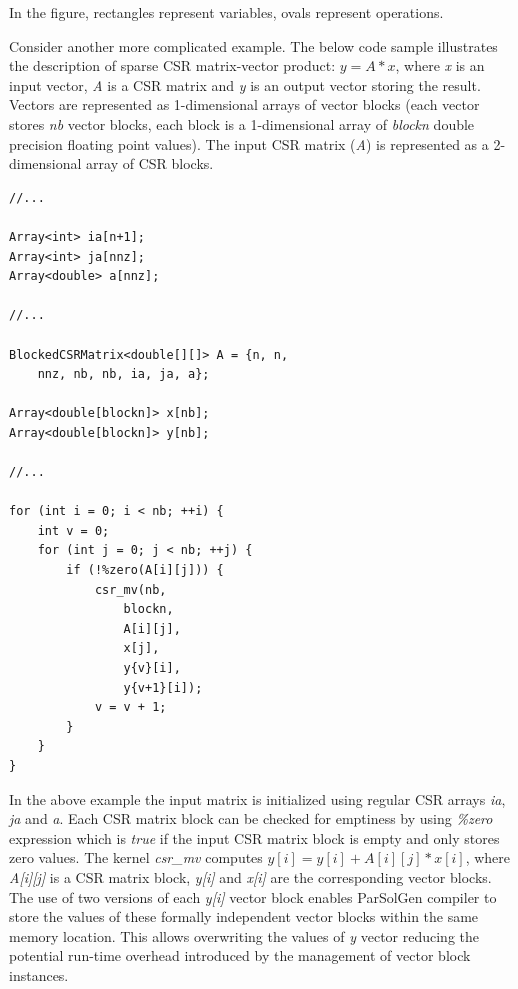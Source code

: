 \documentclass[conference]{IEEEtran}
\begin{document}
In the figure, rectangles represent variables, ovals represent operations.

Consider another more complicated example.
The below code sample illustrates the description of sparse CSR matrix-vector product: \(y = A*x\), where 
\textit{x} is an input vector, \textit{A} is a CSR matrix and \textit{y} is an output vector storing the result. 
Vectors are represented as 1-dimensional arrays of vector blocks (each vector stores \textit{nb} vector blocks, each 
block is a 1-dimensional array of \textit{blockn} double precision floating point values). The input CSR matrix 
(\textit{A}) is represented as a 2-dimensional array of CSR blocks.
\begin{lstlisting}[frame=single]
//...

Array<int> ia[n+1];
Array<int> ja[nnz];
Array<double> a[nnz];

//...

BlockedCSRMatrix<double[][]> A = {n, n, 
	nnz, nb, nb, ia, ja, a};

Array<double[blockn]> x[nb];
Array<double[blockn]> y[nb];

//...

for (int i = 0; i < nb; ++i) {
	int v = 0;
	for (int j = 0; j < nb; ++j) {
		if (!%zero(A[i][j])) {
			csr_mv(nb, 
				blockn, 
				A[i][j], 
				x[j], 
				y{v}[i], 
				y{v+1}[i]);
			v = v + 1;
		}
	}
}
\end{lstlisting}

In the above example the input matrix is initialized using regular CSR arrays \textit{ia}, \textit{ja} and 
\textit{a}. Each CSR matrix block can be checked for emptiness by using \textit{\%zero} expression which is 
\textit{true} if the input CSR matrix block is empty and only stores zero values. The kernel \textit{csr\_mv} 
computes \( y[i] = y[i] + A[i][j] * x[i] \), where \textit{A[i][j]} is a CSR matrix block, 
\textit{y[i]} and \textit{x[i]} are the corresponding vector blocks. The use of two versions of each \textit{y[i]} vector 
block enables ParSolGen compiler to store the values of these formally independent vector blocks within the same 
memory location. This allows overwriting the values of \textit{y} vector reducing the potential run-time overhead 
introduced by the management of vector block instances.
\end{document}

